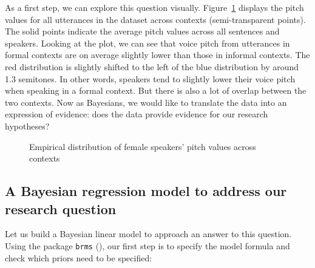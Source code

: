 \documentclass[
  doc,
  floatsintext,
  longtable,
  nolmodern,
  notxfonts,
  notimes,
  colorlinks=true,linkcolor=blue,citecolor=blue,urlcolor=blue]{apa7}
\begin{document}
As a first step, we can explore this question visually.
Figure~\ref{fig-descriptive-dataviz} displays the pitch values for all
utterances in the dataset across contexts (semi-transparent points). The
solid points indicate the average pitch values across all sentences and
speakers. Looking at the plot, we can see that voice pitch from
utterances in formal contexts are on average slightly lower than those
in informal contexts. The red distribution is slightly shifted to the
left of the blue distribution by around 1.3 semitones. In other words,
speakers tend to slightly lower their voice pitch when speaking in a
formal context. But there is also a lot of overlap between the two
contexts. Now as Bayesians, we would like to translate the data into an
expression of evidence: does the data provide evidence for our research
hypotheses?

\begin{figure}[!tbph]

\caption{\label{fig-descriptive-dataviz}Empirical distribution of female
speakers' pitch values across contexts}


\end{figure}%

\subsection{A Bayesian regression model to address our research
question}\label{a-bayesian-regression-model-to-address-our-research-question}

Let us build a Bayesian linear model to approach an answer to this
question. Using the package \texttt{brms}
(), our first
step is to specify the model formula and check which priors need to be
specified:
\end{document}
